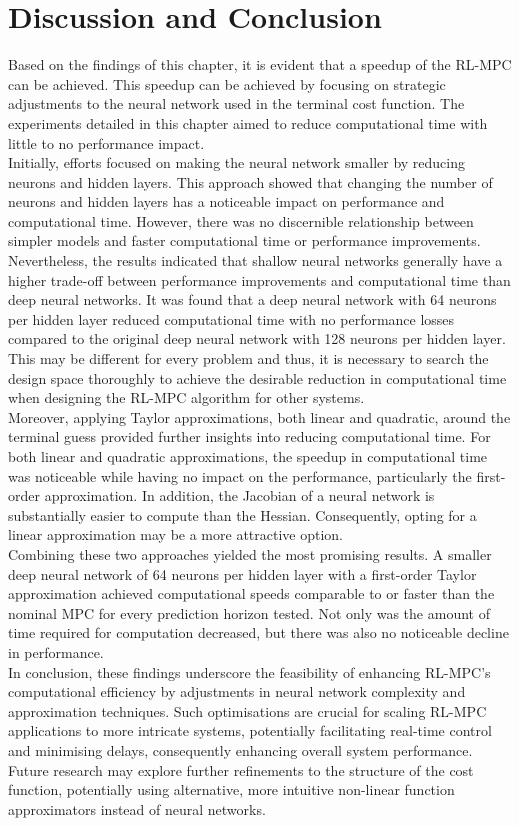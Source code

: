 \section{Discussion and Conclusion}
Based on the findings of this chapter, it is evident that a speedup of the RL-MPC can be achieved. This speedup can be achieved by focusing on strategic adjustments to the neural network used in the terminal cost function. The experiments detailed in this chapter aimed to reduce computational time with little to no performance impact.\\
Initially, efforts focused on making the neural network smaller by reducing neurons and hidden layers. This approach showed that changing the number of neurons and hidden layers has a noticeable impact on performance and computational time. However, there was no discernible relationship between simpler models and faster computational time or performance improvements. Nevertheless, the results indicated that shallow neural networks generally have a higher trade-off between performance improvements and computational time than deep neural networks. It was found that a deep neural network with 64 neurons per hidden layer reduced computational time with no performance losses compared to the original deep neural network with 128 neurons per hidden layer. This may be different for every problem and thus, it is necessary to search the design space thoroughly to achieve the desirable reduction in computational time when designing the RL-MPC algorithm for other systems. \\
Moreover, applying Taylor approximations, both linear and quadratic, around the terminal guess provided further insights into reducing computational time. For both linear and quadratic approximations, the speedup in computational time was noticeable while having no impact on the performance, particularly the first-order approximation. In addition, the Jacobian of a neural network is substantially easier to compute than the Hessian. Consequently, opting for a linear approximation may be a more attractive option.\\
Combining these two approaches yielded the most promising results. A smaller deep neural network of 64 neurons per hidden layer with a first-order Taylor approximation achieved computational speeds comparable to or faster than the nominal MPC for every prediction horizon tested. Not only was the amount of time required for computation decreased, but there was also no noticeable decline in performance. \\
In conclusion, these findings underscore the feasibility of enhancing RL-MPC’s computational efficiency by  adjustments in neural network complexity and approximation techniques. Such optimisations are crucial for scaling RL-MPC applications to more intricate systems, potentially facilitating real-time control and minimising delays, consequently enhancing overall system performance. Future research may explore further refinements to the structure of the cost function, potentially using alternative, more intuitive non-linear function approximators instead of neural networks.

